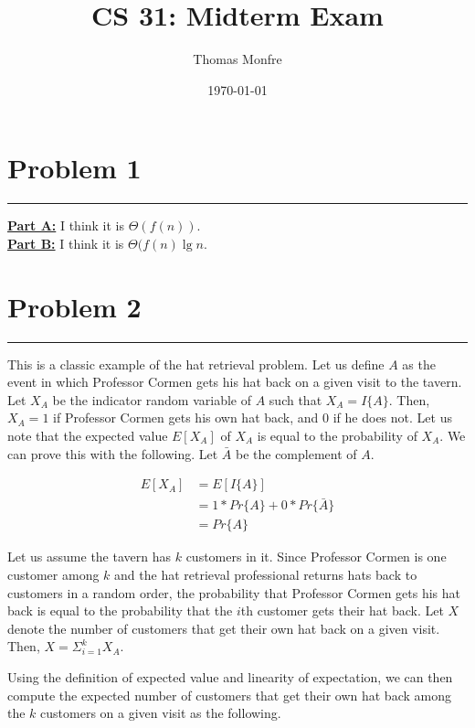 \documentclass[11pt]{article}
\title{CS 31: Midterm Exam}
\author{Thomas Monfre}
\date{\today}
\def\separateline{\medskip\hrule\medskip}
\begin{document}
\maketitle

\section{Problem 1}
\separateline

\textbf{\underline{Part A:}} I think it is $\Theta(f(n))$.\\

\textbf{\underline{Part B:}} I think it is $\Theta(f(n)\lg{n}$.\\

\newpage

\section{Problem 2}
\separateline

This is a classic example of the hat retrieval problem. Let us define $A$ as the event in which Professor Cormen gets his hat back on a given visit to the tavern. Let $X_A$ be the indicator random variable of $A$ such that $X_A = I\{A\}$. Then, $X_A = 1$ if Professor Cormen gets his own hat back, and 0 if he does not. Let us note that the expected value $E[X_A]$ of $X_A$ is equal to the probability of $X_A$. We can prove this with the following. Let $\bar{A}$ be the complement of $A$.

\begin{equation}
\begin{split}
E[X_A] &= E[I\{A\}]\\
     &= 1*Pr\{A\} + 0*Pr\{\bar{A}\}\\
     &= Pr\{A\}
\end{split}
\end{equation}

Let us assume the tavern has $k$ customers in it. Since Professor Cormen is one customer among $k$ and the hat retrieval professional returns hats back to customers in a random order, the probability that Professor Cormen gets his hat back is equal to the probability that the $i$th customer gets their hat back. Let $X$ denote the number of customers that get their own hat back on a given visit. Then, $X = \Sigma_{i=1}^{k}{X_A}$.

Using the definition of expected value and linearity of expectation, we can then compute the expected number of customers that get their own hat back among the $k$ customers on a given visit as the following.
\end{document}
